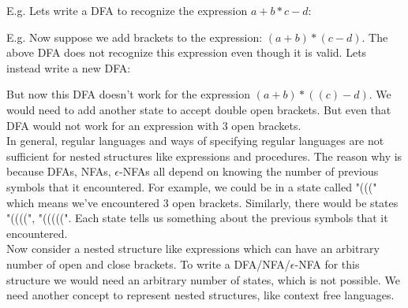 \documentclass[12pt, letterpaper]{article}
\begin{document}
E.g. Lets write a DFA to recognize the expression \(a + b * c - d\):
\begin{center}
\end{center}

E.g. Now suppose we add brackets to the expression: \((a + b) * (c - d)\). The above DFA does not recognize this expression even though it is valid. Lets instead write a new DFA:
\begin{center}
\end{center}

But now this DFA doesn't work for the expression \((a + b) * ((c) - d)\). We would need to add another state to accept double open brackets. But even that DFA would not work for an expression with 3 open brackets.\\

In general, regular languages and ways of specifying regular languages are not sufficient for nested structures like expressions and procedures. The reason why is because DFAs, NFAs, \(\epsilon\)-NFAs all depend on knowing the number of previous symbols that it encountered. For example, we could be in a state called "(((" which means we've encountered 3 open brackets. Similarly, there would be states "((((", "(((((". Each state tells us something about the previous symbols that it encountered.\\

Now consider a nested structure like expressions which can have an arbitrary number of open and close brackets. To write a DFA/NFA/\(\epsilon\)-NFA for this structure we would need an arbitrary number of states, which is not possible. We need another concept to represent nested structures, like context free languages.\\
\end{document}
